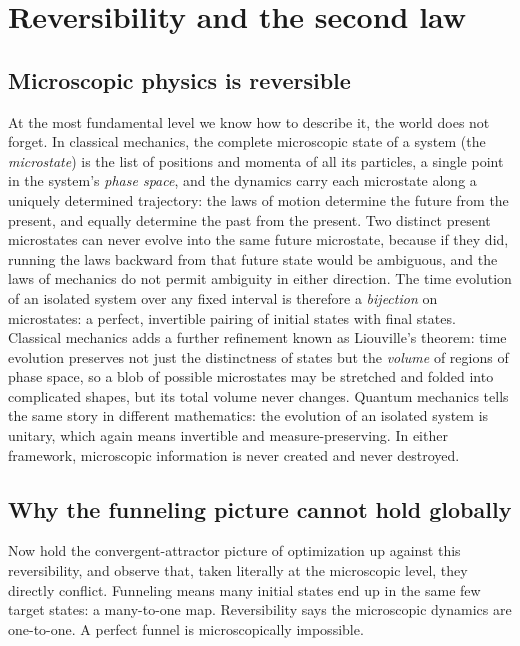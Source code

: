 \documentclass[10pt]{article}
\theoremstyle{definition}
\theoremstyle{remark}
\begin{document}
\section{Reversibility and the second law}
\label{sec:secondlaw}

\subsection{Microscopic physics is reversible}
\label{sec:reversible}

At the most fundamental level we know how to describe it, the world does not forget. In classical mechanics, the complete microscopic state of a system (the \emph{microstate}) is the list of positions and momenta of all its particles, a single point in the system's \emph{phase space}, and the dynamics carry each microstate along a uniquely determined trajectory: the laws of motion determine the future from the present, and equally determine the past from the present. Two distinct present microstates can never evolve into the same future microstate, because if they did, running the laws backward from that future state would be ambiguous, and the laws of mechanics do not permit ambiguity in either direction. The time evolution of an isolated system over any fixed interval is therefore a \emph{bijection} on microstates: a perfect, invertible pairing of initial states with final states. Classical mechanics adds a further refinement known as Liouville's theorem: time evolution preserves not just the distinctness of states but the \emph{volume} of regions of phase space, so a blob of possible microstates may be stretched and folded into complicated shapes, but its total volume never changes. Quantum mechanics tells the same story in different mathematics: the evolution of an isolated system is unitary, which again means invertible and measure-preserving. In either framework, microscopic information is never created and never destroyed.

\subsection{Why the funneling picture cannot hold globally}
\label{sec:nofunnel}

Now hold the convergent-attractor picture of optimization up against this reversibility, and observe that, taken literally at the microscopic level, they directly conflict. Funneling means many initial states end up in the same few target states: a many-to-one map. Reversibility says the microscopic dynamics are one-to-one. A perfect funnel is microscopically impossible.
\end{document}
